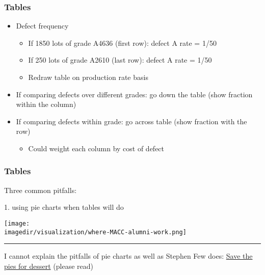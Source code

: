 \begin{frame}\frametitle{Tables}
	\begin{itemize}
		\item	Defect frequency 
		\begin{itemize}
			\item	If 1850 lots of grade A4636 (first row): defect A rate = 1/50 
			\item	If 250 lots of grade A2610 (last row): defect A rate = 1/50 
			\item	Redraw table on production rate basis 
		\end{itemize}
		\item	If comparing defects over different grades: go down the table (show fraction within the column) 
		\item	If comparing defects within grade: go across table (show fraction with the row) 
		\begin{itemize}
			\item	Could weight each column by cost of defect 
		\end{itemize}
	\end{itemize}
\end{frame}

\begin{frame}\frametitle{Tables}
	Three common pitfalls:
	
	1. using pie charts when tables will do 
	\begin{center}
		\texttt{[image: \\imagedir/visualization/where-MACC-alumni-work.png]}
	\end{center}
	\hrule
	\vspace{4pt}
	I cannot explain the pitfalls of pie charts as well as Stephen Few does: \href{http://www.perceptualedge.com/articles/08-21-07.pdf}{Save the pies for dessert} (please read)
\end{frame}

